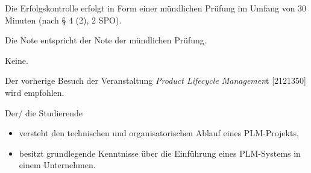 \begin{course}

\setdoclanguagegerman
{}



\coursehead


\label{cour_7499.dp_997}


\begin{styleenv}
\begin{assessment}
Die Erfolgskontrolle erfolgt in Form einer mündlichen Prüfung im Umfang von 30 Minuten (nach § 4 (2), 2 SPO).

 

Die Note entspricht der Note der mündlichen Prüfung.


\end{assessment}

\begin{conditions}Keine.\end{conditions}

\begin{recommendations}Der vorherige Besuch der Veranstaltung \emph{Product Lifecycle Managemen}t [2121350] wird empfohlen.

\end{recommendations}
\end{styleenv}

\begin{learningoutcomes}
Der/ die Studierende

 \begin{itemize}\item versteht den technischen und organisatorischen Ablauf eines PLM-Projekts,  \item besitzt grundlegende Kenntnisse über die Einführung eines PLM-Systems in einem Unternehmen.  \end{itemize}
\end{learningoutcomes}


\end{course}
